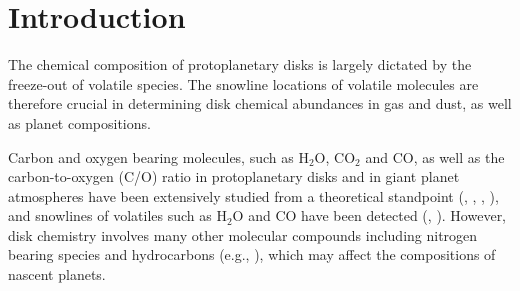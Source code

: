\documentclass[apj]{emulateapj}
\begin{document}
\section{Introduction}
\label{sec:intro}

The chemical composition of protoplanetary disks is largely dictated by the freeze-out of volatile species. The snowline locations of volatile molecules are therefore crucial in determining disk chemical abundances in gas and dust, as well as planet compositions.  

Carbon and oxygen bearing molecules, such as H$_2$O, CO$_2$ and CO, as well as the carbon-to-oxygen (C/O) ratio in protoplanetary disks and in giant planet atmospheres have been extensively studied from a theoretical standpoint (\citealt{oberg11}, \citealt{alidib14}, \citealt{madhu14}, \citealt{molliere15}), and snowlines of volatiles such as H$_2$O and CO have been detected (\citealt{zhang13}, \citealt{qi13}). However, disk chemistry involves many other molecular compounds \citep{henning13} including nitrogen bearing species and hydrocarbons (e.g., \citealt{mandell12}), which may affect the compositions of nascent planets.
\end{document}
